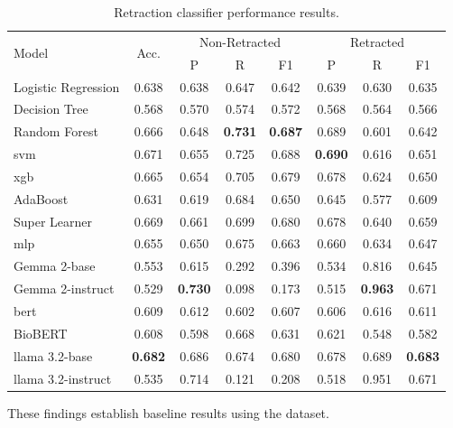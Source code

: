 \documentclass[pdflatex,sn-mathphys-num]{sn-jnl}%
\begin{document}
\begin{table}[htbp]
\caption{Retraction classifier performance results.}\label{tab:classifier-scores-new}
\small
\begin{tabular}{l*{7}{c}}
\toprule
\multirow{2}{*}{Model} & \multirow{2}{*}{Acc.} & \multicolumn{3}{c}{Non-Retracted} & \multicolumn{3}{c}{Retracted} \\
\cmidrule(lr){3-5} \cmidrule(lr){6-8}
& & P & R & F1 & P & R & F1 \\
\midrule
Logistic Regression & 0.638 & 0.638 & 0.647 & 0.642 & 0.639 & 0.630 & 0.635 \\
Decision Tree & 0.568 & 0.570 & 0.574 & 0.572 & 0.568 & 0.564 & 0.566 \\
Random Forest & 0.666 & 0.648 &\textbf {0.731} & \textbf{0.687} & 0.689 & 0.601 & 0.642 \\
\gls*{svm} & 0.671 & 0.655 & 0.725 & 0.688 & \textbf{0.690} & 0.616 & 0.651 \\
\gls*{xgb} & 0.665 & 0.654 & 0.705 & 0.679 & 0.678 & 0.624 & 0.650 \\
AdaBoost & 0.631 & 0.619 & 0.684 & 0.650 & 0.645 & 0.577 & 0.609 \\
Super Learner & 0.669 & 0.661 & 0.699 & 0.680 & 0.678 & 0.640 & 0.659 \\
\gls*{mlp} & 0.655 & 0.650 & 0.675 & 0.663 & 0.660 & 0.634 & 0.647 \\
Gemma 2-base & 0.553 & 0.615 & 0.292 & 0.396 & 0.534 & 0.816 & 0.645 \\
Gemma 2-instruct & 0.529 &\textbf{ 0.730} & 0.098 & 0.173 & 0.515 & \textbf{0.963} & 0.671 \\
\gls*{bert} & 0.609 & 0.612 & 0.602 & 0.607 & 0.606 & 0.616 & 0.611\\
BioBERT & 0.608 & 0.598 & 0.668 & 0.631  & 0.621 & 0.548  & 0.582\\
\gls*{llama} 3.2-base & \textbf{0.682} &0.686 & 0.674 & 0.680  & 0.678 &  0.689  & \textbf{0.683}\\
\gls*{llama} 3.2-instruct & 0.535 & 0.714 & 0.121 & 0.208  & 0.518 &  0.951  & 0.671\\
\bottomrule
\end{tabular}
\end{table}






These findings establish baseline results using the dataset. 
\end{document}
